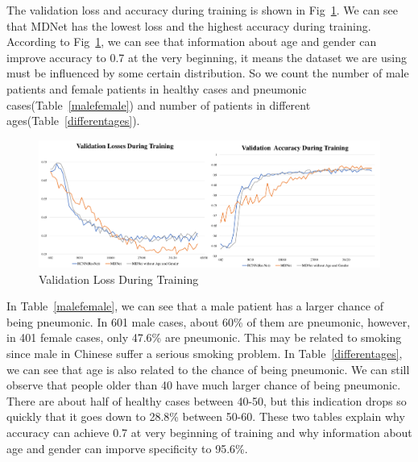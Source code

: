 \documentclass[journal]{IEEEtran}
\begin{document}
The validation loss and accuracy during training is shown in Fig~\ref{loss}. We can see that MDNet has the lowest loss and the highest accuracy during training.
According to Fig~\ref{loss}, we can see that information about age and gender can improve accuracy to 0.7 at the very beginning, it means the dataset we are using must be influenced by some certain distribution. So we count the number of male patients and female patients in healthy cases and pneumonic cases(Table~\ref{malefemale}) and number of patients in different ages(Table~\ref{differentages}). 


\begin{figure}[t]
    \centerline{\includegraphics[width=200mm]{losses.pdf}}
    \vspace{-0cm}
    \caption{Validation Loss During Training}
    \vspace{-0cm}
    \label{loss}
    \end{figure}


In Table~\ref{malefemale}, we can see that a male patient has a larger chance of being pneumonic. In 601 male cases, about 60\% of them are pneumonic, however, in 401 female cases, only 47.6\% are pneumonic. This may be related to smoking since male in Chinese suffer a serious smoking problem. 
In Table~\ref{differentages}, we can see that age is also related to the chance of being pneumonic. We can still observe that people older than 40 have much larger chance of being pneumonic. There are about half of healthy cases between 40-50, but this indication drops so quickly that it goes down to 28.8\% between 50-60. These two tables explain why accuracy can achieve 0.7 at very beginning of training and why information about age and gender can imporve specificity to 95.6\%.
\end{document}
